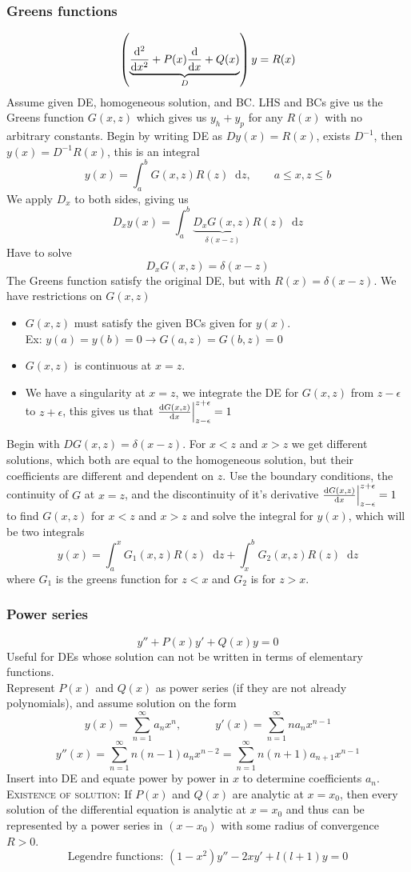 \documentclass[a4paper, 10pt]{article}
\newcommand*\diff{\mathop{}\!\mathrm{d}}
\begin{document}
\begin{multicols*}{3}
\subsubsection*{\small Greens functions}
$$ \left(\underbrace{\dv[2]{}{x} + P(x)\dv{}{x} + Q(x)}_{D}\right)y = R(x) $$
Assume given DE, homogeneous solution, and BC. LHS and BCs give us the Greens function $G(x,z)$ which gives us $y_h + y_p$ for any $R(x)$ with no arbitrary constants. Begin by writing DE as $Dy(x)=R(x)$, exists $D^{-1}$, then $y(x) = D^{-1}R(x)$, this is an integral $$y(x) = \int_a^b G(x,z)R(z)\diff z, \qquad a \leq x, z \leq b$$
We apply $D_x$ to both sides, giving us
$$D_xy(x) = \int_a^b \underbrace{D_xG(x,z)}_{\delta(x-z)}R(z)\diff z$$
Have to solve
$$ D_xG(x,z) = \delta(x-z)$$
The Greens function satisfy the original DE, but with $R(x) = \delta(x-z)$. We have restrictions on $G(x,z)$
\begin{itemize}
  \item $G(x,z)$ must satisfy the given BCs given for $y(x)$.\\ Ex: $y(a)=y(b)=0 \rightarrow G(a,z) = G(b,z)=0$
  \item $G(x,z)$ is continuous at $x=z$.
  \item We have a singularity at $x=z$, we integrate the DE for $G(x,z)$ from $z-\epsilon$ to $z+\epsilon$, this gives us that $\dv{G(x,z)}{x}\Big|_{z-\epsilon}^{z+\epsilon} = 1$
\end{itemize}
Begin with $DG(x,z)=\delta(x-z)$. For $x<z$ and $x>z$ we get different solutions, which both are equal to the homogeneous solution, but their coefficients are different and dependent on $z$. Use the boundary conditions, the continuity of $G$ at $x=z$, and the discontinuity of it's derivative $\dv{G(x,z)}{x}\Big|_{z-\epsilon}^{z+\epsilon} = 1$ to find $G(x,z)$ for $x<z$ and $x>z$ and solve the integral for $y(x)$, which will be two integrals
$$y(x) = \int_a^x G_1(x,z)R(z) \diff z + \int_x^b G_2(x,z)R(z) \diff z$$
where $G_1$ is the greens function for $z<x$ and $G_2$ is for $z>x$.

\subsubsection*{\small Power series}
$$ y'' + P(x)y' + Q(x)y = 0$$
Useful for DEs whose solution can not be written in terms of elementary functions. \\
Represent $P(x)$ and $Q(x)$ as power series (if they are not already polynomials), and assume solution on the form
$$ y(x) = \sum_{n=1}^{\infty} a_n x^n, \qquad \quad y'(x) = \sum_{n=1}^{\infty} na_n x^{n-1}$$ $$y''(x) = \sum_{n=1}^{\infty} n(n-1)a_n x^{n-2} = \sum_{n=1}^{\infty} n(n+1)a_{n+1} x^{n-1}$$
Insert into DE and equate power by power in $x$ to determine coefficients $a_n$.\\
\textsc{Existence of solution:} If $P(x)$ and $Q(x)$ are analytic at $x=x_0$, then every solution of the differential equation is analytic at $x=x_0$ and thus can be represented by a power series in $(x-x_0)$ with some radius of convergence $R>0$.
$$ \text{Legendre functions: } (1-x^2)y'' -2xy' + l(l+1)y = 0$$



\end{multicols*}
\end{document}
